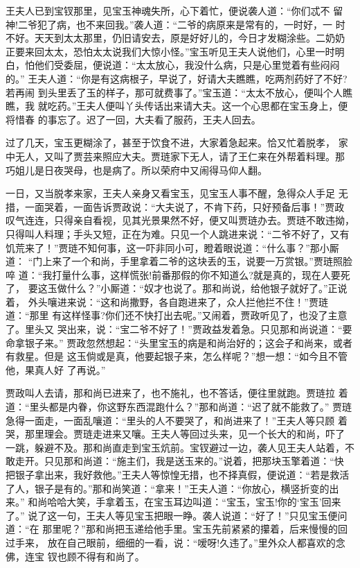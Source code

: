 王夫人已到宝钗那里，见宝玉神魂失所，心下着忙，便说袭人道：“你们忒不
留神!二爷犯了病，也不来回我。”袭人道：“二爷的病原来是常有的，一时好，一
时不好。天天到太太那里，仍旧请安去，原是好好儿的，今日才发糊涂些。二奶奶
正要来回太太，恐怕太太说我们大惊小怪。”宝玉听见王夫人说他们，心里一时明
白，怕他们受委屈，便说道：“太太放心，我没什么病，只是心里觉着有些闷闷的。”
王夫人道：“你是有这病根子，早说了，好请大夫瞧瞧，吃两剂药好了不好?若再闹
到头里丢了玉的样子，那可就费事了。”宝玉道：“太太不放心，便叫个人瞧瞧，我
就吃药。”王夫人便叫丫头传话出来请大夫。这一个心思都在宝玉身上，便将惜春
的事忘了。迟了一回，大夫看了服药，王夫人回去。

过了几天，宝玉更糊涂了，甚至于饮食不进，大家着急起来。恰又忙着脱孝，
家中无人，又叫了贾芸来照应大夫。贾琏家下无人，请了王仁来在外帮着料理。那
巧姐儿是日夜哭母，也是病了。所以荣府中又闹得马仰人翻。

一日，又当脱孝来家，王夫人亲身又看宝玉，见宝玉人事不醒，急得众人手足
无措，一面哭着，一面告诉贾政说：“大夫说了，不肯下药，只好预备后事！”贾政
叹气连连，只得亲自看视，见其光景果然不好，便又叫贾琏办去。贾琏不敢违拗，
只得叫人料理；手头又短，正在为难。只见一个人跳进来说：“二爷不好了，又有
饥荒来了！”贾琏不知何事，这一吓非同小可，瞪着眼说道：“什么事？”那小厮道：
“门上来了一个和尚，手里拿着二爷的这块丢的玉，说要一万赏银。”贾琏照脸啐
道：“我打量什么事，这样慌张!前番那假的你不知道么?就是真的，现在人要死了，
要这玉做什么？”小厮道：“奴才也说了。那和尚说，给他银子就好了。”正说着，
外头嚷进来说：“这和尚撒野，各自跑进来了，众人拦他拦不住！”贾琏道：“那里
有这样怪事?你们还不快打出去呢。”又闹着，贾政听见了，也没了主意了。里头又
哭出来，说：“宝二爷不好了！”贾政益发着急。只见那和尚说道：“要命拿银子来。”
贾政忽然想起：“头里宝玉的病是和尚治好的；这会子和尚来，或者有救星。但是
这玉倘或是真，他要起银子来，怎么样呢？”想一想：“如今且不管他，果真人好
了再说。”

贾政叫人去请，那和尚已进来了，也不施礼，也不答话，便往里就跑。贾琏拉
着道：“里头都是内眷，你这野东西混跑什么？”那和尚道：“迟了就不能救了。”
贾琏急得一面走，一面乱嚷道：“里头的人不要哭了，和尚进来了！”王夫人等只顾
着哭，那里理会。贾琏走进来又嚷。王夫人等回过头来，见一个长大的和尚，吓了
一跳，躲避不及。那和尚直走到宝玉炕前。宝钗避过一边，袭人见王夫人站着，不
敢走开。只见那和尚道：“施主们，我是送玉来的。”说着，把那块玉擎着道：“快
把银子拿出来，我好救他。”王夫人等惊惶无措，也不择真假，便说道：“若是救活
了人，银子是有的。”那和尚笑道：“拿来！”王夫人道：“你放心，横竖折变的出来。”
和尚哈哈大笑，手拿着玉，在宝玉耳边叫道：“宝玉，宝玉!你的‘宝玉’回来了。”
说了这一句，王夫人等见宝玉把眼一睁。袭人说道：“好了！”只见宝玉便问道：“在
那里呢？”那和尚把玉递给他手里。宝玉先前紧紧的攥着，后来慢慢的回过手来，
放在自己眼前，细细的一看，说：“嗳呀!久违了。”里外众人都喜欢的念佛，连宝
钗也顾不得有和尚了。


